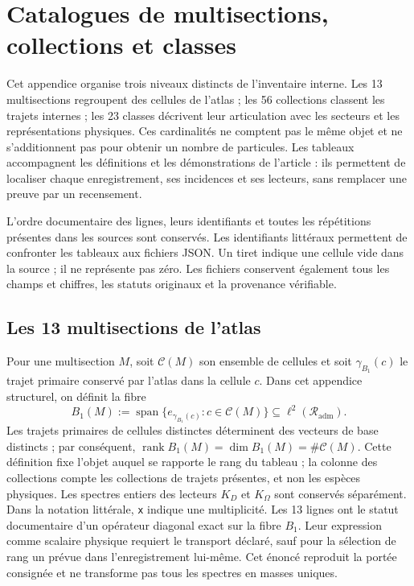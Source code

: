 \clearpage
\section{Catalogues de multisections, collections et classes}
\label{sec:vi-catalogos-estructurales}

Cet appendice organise trois niveaux distincts de l'inventaire interne. Les
13 multisections regroupent des cellules de l'atlas ; les 56 collections
classent les trajets internes ; les 23 classes décrivent leur articulation
avec les secteurs et les représentations physiques. Ces cardinalités ne
comptent pas le même objet et ne s'additionnent pas pour obtenir un nombre
de particules. Les tableaux accompagnent les définitions et les démonstrations
de l'article : ils permettent de localiser chaque enregistrement, ses
incidences et ses lecteurs, sans remplacer une preuve par un recensement.

L'ordre documentaire des lignes, leurs identifiants et toutes les répétitions
présentes dans les sources sont conservés. Les identifiants littéraux permettent
de confronter les tableaux aux fichiers JSON. Un tiret indique une cellule vide
dans la source ; il ne représente pas zéro. Les fichiers conservent également
tous les champs et chiffres, les statuts originaux et la provenance vérifiable.
\CatalogRouteReference

\subsection{Les 13 multisections de l'atlas}

Pour une multisection \(M\), soit \(\mathcal C(M)\) son ensemble de cellules et
soit \(\gamma_{B_1}(c)\) le trajet primaire conservé par l'atlas dans la cellule
\(c\). Dans cet appendice structurel, on définit la fibre
\[
 B_1(M):=
 \operatorname{span}\bigl\{e_{\gamma_{B_1}(c)}:c\in\mathcal C(M)\bigr\}
 \subseteq \ell^2(\mathcal R_{\mathrm{adm}}).
\]
Les trajets primaires de cellules distinctes déterminent des vecteurs de base
distincts ; par conséquent,
\(\operatorname{rank}B_1(M)=\dim B_1(M)=\#\mathcal C(M)\).
Cette définition fixe l'objet auquel se rapporte le rang du tableau ; la
colonne des collections compte les collections de trajets présentes, et non
les espèces physiques. Les spectres entiers des lecteurs \(K_D\) et
\(K_\Omega\) sont conservés séparément. Dans la notation littérale,
\texttt{x} indique une multiplicité. Les 13 lignes ont le statut documentaire
d'un opérateur diagonal exact sur la fibre \(B_1\). Leur expression comme
scalaire physique requiert le transport déclaré, sauf pour la sélection de
rang un prévue dans l'enregistrement lui-même. Cet énoncé reproduit la portée
consignée et ne transforme pas tous les spectres en masses uniques.

